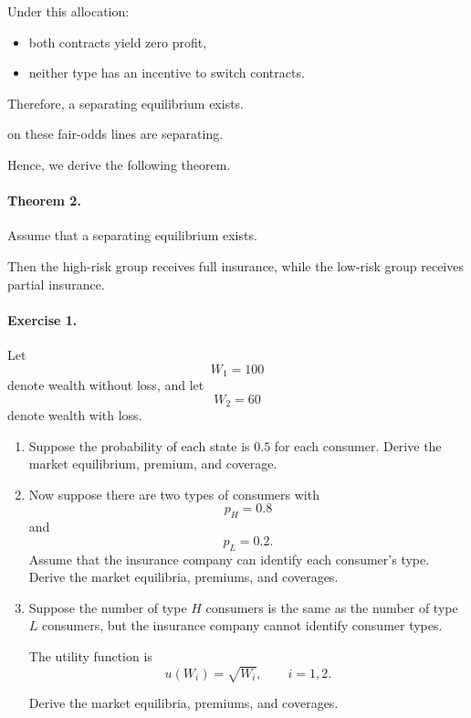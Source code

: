 Under this allocation:

\begin{itemize}
    \item both contracts yield zero profit,
    \item neither type has an incentive to switch contracts.
\end{itemize}

Therefore, a separating equilibrium exists.




on these fair-odds lines are separating.

Hence, we derive the following theorem.

\paragraph{Theorem 2.}

Assume that a separating equilibrium exists.

Then the high-risk group receives full insurance, while the low-risk group receives partial insurance.

\paragraph{Exercise 1.}

Let
\[
W_1=100
\]
denote wealth without loss, and let
\[
W_2=60
\]
denote wealth with loss.

\begin{enumerate}
    \item[(A)] Suppose the probability of each state is \(0.5\) for each consumer. Derive the market equilibrium, premium, and coverage.

    \item[(B)] Now suppose there are two types of consumers with
    \[
    p_H=0.8
    \]
    and
    \[
    p_L=0.2.
    \]
    Assume that the insurance company can identify each consumer's type. Derive the market equilibria, premiums, and coverages.

    \item[(C)] Suppose the number of type \(H\) consumers is the same as the number of type \(L\) consumers, but the insurance company cannot identify consumer types.

    The utility function is
    \[
    u(W_i)=\sqrt{W_i},
    \qquad
    i=1,2.
    \]

    Derive the market equilibria, premiums, and coverages.
\end{enumerate}

